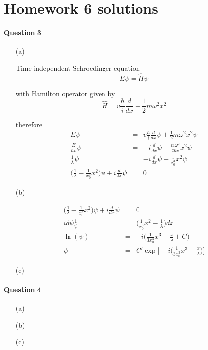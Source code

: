 \documentclass[11pt,a4paper]{article}
\author{Zehao Gao}
\begin{document}
\section*{Homework 6 solutions}

\paragraph*{Question 3}

\begin{enumerate}

\item[(a)]

    Time-independent Schroedinger equation
    \begin{equation} 
        E\psi=\hat{H}\psi
    \end{equation}

    with Hamilton operator given by
    \begin{equation}
        \hat{H}=v\frac{\hbar}{i}\frac{d}{dx}+\frac{1}{2}m\omega^2x^2
    \end{equation}

    therefore
    \begin{eqnarray} 
        E\psi&=&v\frac{\hbar}{i}\frac{d}{dx}\psi+\frac{1}{2}m\omega^2x^2\psi \\
        \frac{E}{\hbar v}\psi&=&-i\frac{d}{dx}\psi+\frac{m\omega^2}{2\hbar v}x^2\psi \\
        \frac{1}{\lambda}\psi&=&-i\frac{d}{dx}\psi+\frac{1}{x^3_0}x^2\psi \\
        \bigg(\frac{1}{\lambda}-\frac{1}{x^3_0}x^2\bigg)\psi+i\frac{d}{dx}\psi&=&0
    \end{eqnarray}

\item[(b)]

    \begin{eqnarray}
        \bigg(\frac{1}{\lambda}-\frac{1}{x^3_0}x^2\bigg)\psi+i\frac{d}{dx}\psi&=&0 \\
        id\psi\frac{1}{\psi}&=&\bigg(\frac{1}{x^3_0}x^2-\frac{1}{\lambda}\bigg)dx \\
        \ln{(\psi)}&=&-i\bigg(\frac{1}{3x^3_0}x^3-\frac{x}{\lambda}+C\bigg) \\
        \psi&=&C'\exp{\bigg[-i\Big(\frac{1}{3x^3_0}x^3-\frac{x}{\lambda}\Big)\bigg]}
    \end{eqnarray}

\item[(c)]

    

\end{enumerate}

\paragraph*{Question 4}

\begin{enumerate}

\item[(a)]

    

\item[(b)]

\item[(c)]

    

\end{enumerate}
\end{document}

